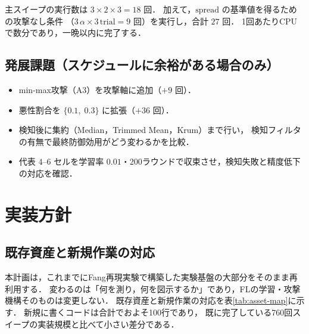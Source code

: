 \documentclass[a4j, dvipdfmx]{jsarticle}  %
\begin{document}
\noindent
主スイープの実行数は $3 \times 2 \times 3 = 18$ 回．
加えて，$\mathrm{spread}$ の基準値を得るための攻撃なし条件
（$3\,\alpha \times 3\,\text{trial} = 9$ 回）を実行し，合計 $27$ 回．
1回あたりCPUで数分であり，一晩以内に完了する．

\subsection{発展課題（スケジュールに余裕がある場合のみ）}

\begin{itemize}
  \item min-max攻撃（A3）を攻撃軸に追加（$+9$ 回）．
  \item 悪性割合を $\{0.1,\; 0.3\}$ に拡張（$+36$ 回）．
  \item 検知後に集約（Median，Trimmed Mean，Krum）まで行い，
        検知フィルタの有無で最終防御効用がどう変わるかを比較．
  \item 代表 $4$--$6$ セルを学習率 $0.01$・$200$ラウンドで収束させ，検知失敗と精度低下の対応を確認．
\end{itemize}

\section{実装方針}

\subsection{既存資産と新規作業の対応}
\label{sec:asset-map}

本計画は，これまでにFang再現実験で構築した実験基盤の大部分をそのまま再利用する．
変わるのは「何を測り，何を図示するか」であり，FLの学習・攻撃機構そのものは変更しない．
既存資産と新規作業の対応を表\ref{tab:asset-map}に示す．
新規に書くコードは合計でおよそ100行であり，
既に完了している760回スイープの実装規模と比べて小さい差分である．
\end{document}
